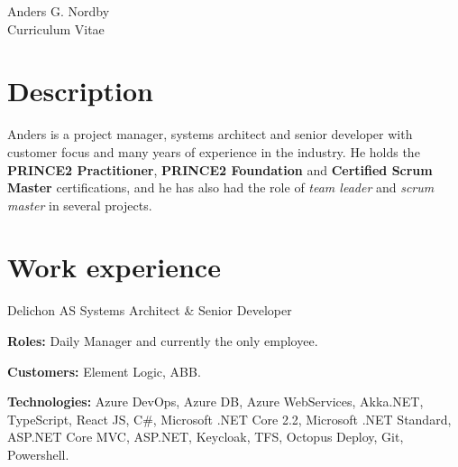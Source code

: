 \documentclass[10pt]{article} %
\begin{document}
\begin{paracol}{2} %


\parbox[top][0.12\textheight][c]{\linewidth}{ %
	\vspace{-0.04\textheight} %
	\centering %
	{\sffamily\Huge Anders G. Nordby}\\\medskip %
	{\Huge\color{headings}\cvtextfont Curriculum Vitae}
}


\section{Description}

Anders is a project manager, systems architect and senior developer with customer focus and many years of experience in the industry.
He holds the \textbf{PRINCE2 Practitioner}, \textbf{PRINCE2 Foundation} and \textbf{Certified Scrum Master} certifications, and he has also
had the role of \textit{team leader} and \textit{scrum master} in several projects. 


\section{Work experience} 

{}
{Delichon AS} 
{Systems Architect \& Senior Developer} 
{\textbf{Roles:} Daily Manager and currently the only employee.

\textbf{Customers:} Element Logic, ABB.

\textbf{Technologies:} Azure DevOps, Azure DB, Azure WebServices, Akka.NET, TypeScript, React JS, C\#, Microsoft .NET Core 2.2, Microsoft .NET Standard, ASP.NET Core MVC, ASP.NET, Keycloak, TFS, Octopus Deploy, Git, Powershell.
} 


\end{paracol}
\end{document}
